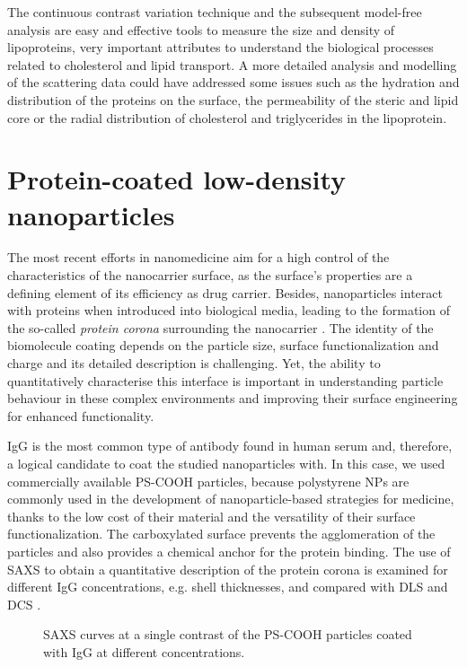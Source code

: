 The continuous contrast variation technique and the subsequent model-free analysis are easy and effective tools to measure the size and density of lipoproteins, very important attributes to understand the biological processes related to cholesterol and lipid transport. A more detailed analysis and modelling of the scattering data could have addressed some issues such as the hydration and distribution of the proteins on the surface, the permeability of the steric and lipid core or the radial distribution of cholesterol and triglycerides in the lipoprotein.


\section{Protein-coated low-density nanoparticles}
\label{sec:CoatedKiskerExperimental}
The most recent efforts in nanomedicine aim for a high control of the characteristics of the nanocarrier surface, as the surface's properties are a defining element of its efficiency as drug carrier. Besides, nanoparticles interact with proteins when introduced into biological media, leading to the formation of the so-called \emph{protein corona} surrounding the nanocarrier \citep{cedervall_understanding_2007,monopoli_physical-chemical_2011,casals_time_2010}. The identity of the biomolecule coating depends on the particle size, surface functionalization and charge \citep{lundqvist_nanoparticle_2008,tenzer_rapid_2013,gessner_functional_2003} and its detailed description is challenging. Yet, the ability to quantitatively characterise this interface is important in understanding particle behaviour in these complex environments and improving their surface engineering for enhanced functionality.

IgG is the most common type of antibody found in human serum and, therefore, a logical candidate to coat the studied nanoparticles with. In this case, we used commercially available PS-COOH particles, because polystyrene NPs are commonly used in the development of nanoparticle-based strategies for medicine, thanks to the low cost of their material and the versatility of their surface functionalization. The carboxylated surface prevents the agglomeration of the particles and also provides a chemical anchor for the protein binding. The use of SAXS to obtain a quantitative description of the protein corona is examined for different IgG concentrations, e.g. shell thicknesses, and compared with DLS and DCS \citep{minelli_characterization_2014}.

\begin{figure}
	\centering
		
		\caption[Scattering curves of the PS-COOH particles coated with IgG.]{SAXS curves at a single contrast of the PS-COOH particles coated with IgG at different concentrations.}
		\label{fig:CoatedKiskerIgGSingleContrastSAXS}
\end{figure}

